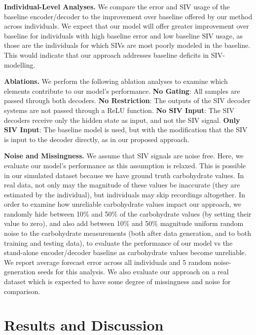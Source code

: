 \documentclass[letterpaper]{article}
\begin{document}
\textbf{Individual-Level Analyses.} We compare the error and SIV usage of the baseline encoder/decoder to the improvement over baseline offered by our method across individuals.  We expect that our model will offer greater improvement over baseline for individuals with high baseline error and low baseline SIV usage, as those are the individuals for which SIVs are most poorly modeled in the baseline. This would indicate that our approach addresses baseline deficits in SIV-modelling.

\textbf{Ablations.}  We perform the following ablation analyses to examine which elements contribute to our model's performance. \textbf{No Gating}: All samples are passed through both decoders. \textbf{No Restriction}: The outputs of the SIV decoder systems are not passed through a ReLU function. \textbf{No SIV Input}: The SIV decoders receive only the hidden state as input, and not the SIV signal. \textbf{Only SIV Input}: The baseline model is used, but with the modification that the SIV is input to the decoder directly, as in our proposed approach.

\textbf{Noise and Missingness.} We assume that SIV signals are noise free. Here, we evaluate our model's performance as this assumption is relaxed. This is possible in our simulated dataset because we have ground truth carbohydrate values. In real data, not only may the magnitude of these values be inaccurate (they are estimated by the individual), but individuals may skip recordings altogether. In order to examine how unreliable carbohydrate values impact our approach, we randomly hide between 10\% and 50\% of the carbohydrate values (by setting their value to zero), and also add between 10\% and 50\% magnitude uniform random noise to the carbohydrate measurements (both after data generation, and to both training and testing data), to evaluate the performance of our model vs the stand-alone encoder/decoder baseline as carbohydrate values become unreliable. We report average forecast error across all individuals and 5 random noise-generation seeds for this analysis. We also evaluate our approach on a real dataset which is expected to have some degree of missingness and noise for comparison.






\section{Results and Discussion}
\end{document}
